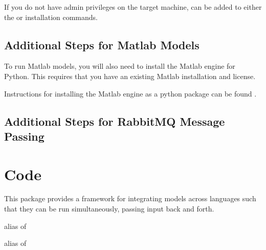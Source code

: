 \documentclass[letterpaper,10pt,english]{sphinxmanual}
\begin{document}
If you do not have admin privileges on the target machine,  can be added to either the  or  installation commands.


\section{Additional Steps for Matlab Models}
\label{\detokenize{install:additional-steps-for-matlab-models}}
To run Matlab models, you will also need to install the Matlab engine for
Python. This requires that you have an existing Matlab installation and license.

Instructions for installing the Matlab engine as a python package can be found
.


\section{Additional Steps for RabbitMQ Message Passing}
\label{\detokenize{install:additional-steps-for-rabbitmq-message-passing}}

\chapter{Code}
\label{\detokenize{code:code}}\label{\detokenize{code::doc}}\label{\detokenize{code:module-cis_interface}}
This package provides a framework for integrating models across languages
such that they can be run simultaneously, passing input back and forth.

\begin{fulllineitems}
\label{\detokenize{code:cis_interface.interface}}
alias of {\hyperref[\detokenize{code:cis_interface.interface}]{}}

\end{fulllineitems}


\begin{fulllineitems}
\label{\detokenize{code:cis_interface.drivers}}
alias of {\hyperref[\detokenize{code:cis_interface.drivers}]{}}

\end{fulllineitems}
\end{document}

